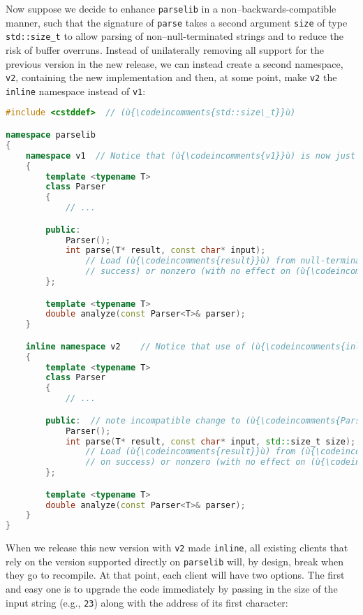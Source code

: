Now suppose we decide to enhance \texttt{parselib} in a
non--backwards-compatible manner, such that the signature of
\texttt{parse} takes a second argument \texttt{size} of type
\texttt{std::size\_t} to allow parsing of non--null-terminated strings
and to reduce the risk of buffer overruns. Instead of unilaterally
removing all support for the previous version in the new release, we can
instead create a second namespace, \texttt{v2}, containing the new
implementation and then, at some point, make \texttt{v2} the
\texttt{inline} namespace instead of \texttt{v1}:

\begin{lstlisting}[language=C++]
#include <cstddef>  // (ù{\codeincomments{std::size\_t}}ù)

namespace parselib
{
    namespace v1  // Notice that (ù{\codeincomments{v1}}ù) is now just a nested namespace.
    {
        template <typename T>
        class Parser
        {
            // ...

        public:
            Parser();
            int parse(T* result, const char* input);
                // Load (ù{\codeincomments{result}}ù) from null-terminated (ù{\codeincomments{input}}ù); return 0 (on
                // success) or nonzero (with no effect on (ù{\codeincomments{result}}ù)).
        };

        template <typename T>
        double analyze(const Parser<T>& parser);
    }

    inline namespace v2    // Notice that use of (ù{\codeincomments{inline}}ù) keyword has moved here.
    {
        template <typename T>
        class Parser
        {
            // ...

        public:  // note incompatible change to (ù{\codeincomments{Parser}}ù)'s essential API
            Parser();
            int parse(T* result, const char* input, std::size_t size);
                // Load (ù{\codeincomments{result}}ù) from (ù{\codeincomments{input}}ù) of specified (ù{\codeincomments{size}}ù); return 0
                // on success) or nonzero (with no effect on (ù{\codeincomments{result}}ù)).
        };

        template <typename T>
        double analyze(const Parser<T>& parser);
    }
}
\end{lstlisting}

\noindent When we release this new version with \texttt{v2} made \texttt{inline},
all existing clients that rely on the version supported directly on
\texttt{parselib} will, by design, break when they go to recompile. At
that point, each client will have two options. The first and easy one is
to upgrade the code immediately by passing in the size of the input
string (e.g., \texttt{23}) along with the address of its first
character:

